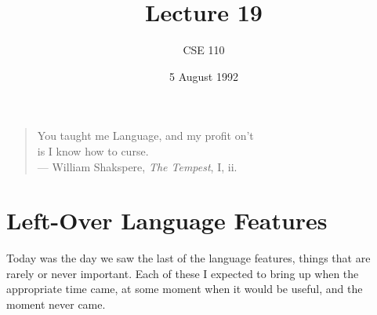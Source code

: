 %
%
%


\def\brac#1{$<${#1}$>$}
\def\Int{{\tt int}}
\def\int{\brac{\Int}}
\def\int{\brac{\Int}}
\def\Shortint{{\tt short~int}}
\def\shortint{\brac{\Shortint}}
\def\Longint{{\tt long~int}}
\def\longint{\brac{\Longint}}
\def\Float{{\tt float}}
\def\float{\brac{\Float}}
\def\Double{{\tt double}}
\def\double{\brac{\Double}}
\def\Char{{\tt char}}
\def\chr{\brac{\Char}}
\def\Void{{\tt void}}
\def\void{\brac{\Void}}

\def\ptr#1{pointer~to {#1}}
\def\p2#1{\brac{\ptr{#1}}}
\def\Ano#1#2{array~of {#1}~{#2}s}
\def\ano#1#2{\brac{\Ano{#1}{#2}}}
\def\Ao#1{array~of {#1}}
\def\ao#1{\brac{\Ao#1}}

\def\np{{\tt NULL} pointer}

\def\breakhere{\mbox{$\otimes$}}


\title{Lecture 19}
\author{CSE 110}
\date{5 August 1992}

\parskip 8pt

\pagestyle{fancy}
\rhead{\thepage}
\cfoot{}




\maketitle

\begin{center}
\begin{quote}
{You taught me Language, and my profit on't \\
is I know how to curse.} \\

{\small --- William Shakspere, {\em The Tempest}, I, ii.}
\end{quote}
\end{center}
\section{Left-Over Language Features}

Today was the day we saw the last of the language features, things that
are rarely or never important.  Each of these I expected to bring up
when the appropriate time came, at some moment when it would be useful,
and the moment never came.  

